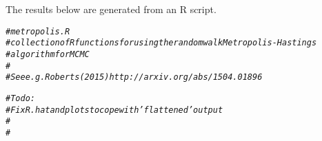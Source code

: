 \documentclass{article}\usepackage[]{graphicx}\usepackage[]{color}
\makeatletter
\newcommand{\hlcom}[1]{\textcolor[rgb]{0.678,0.584,0.686}{\textit{#1}}}%
\newenvironment{kframe}{%
 \def\at@end@of@kframe{}%
 \ifinner\ifhmode%
  \def\at@end@of@kframe{\end{minipage}}%
  \begin{minipage}{\columnwidth}%
 \fi\fi%
 \def\FrameCommand##1{\hskip\@totalleftmargin \hskip-\fboxsep
 \colorbox{shadecolor}{##1}\hskip-\fboxsep
     \hskip-\linewidth \hskip-\@totalleftmargin \hskip\columnwidth}%
 \MakeFramed {\advance\hsize-\width
   \@totalleftmargin\z@ \linewidth\hsize
   \@setminipage}}%
 {\par\unskip\endMakeFramed%
 \at@end@of@kframe}
\newenvironment{knitrout}{}{} %
\makeatother
\begin{document}
The results below are generated from an R script.

\begin{knitrout}
\color{fgcolor}\begin{kframe}
\begin{alltt}
\hlcom{# metropolis.R}
\hlcom{# collection of R functions for using the random walk Metropolis-Hastings}
\hlcom{# algorithm for MCMC}
\hlcom{#}
\hlcom{# See e.g. Roberts (2015) http://arxiv.org/abs/1504.01896 }
\end{alltt}
\end{kframe}
\end{knitrout}
\begin{knitrout}
\color{fgcolor}\begin{kframe}
\begin{alltt}
\hlcom{# To do:}
\hlcom{#  Fix R.hat and plots to cope with 'flattened' output}
\hlcom{#}
\hlcom{#}
\end{alltt}
\end{kframe}
\end{knitrout}
\end{document}
